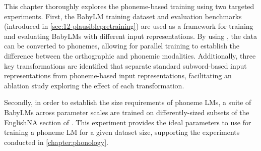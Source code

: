 This chapter thoroughly explores the phoneme-based training using two targeted experiments. First, the BabyLM training dataset and evaluation benchmarks (introduced in \cref{sec:12-plausiblepretraining}) are used as a framework for training and evaluating BabyLMs with different input representations. By using \gpp, the data can be converted to phonemes, allowing for parallel training to establish the difference between the orthographic and phonemic modalities. Additionally, three key transformations are identified that separate standard subword-based input representations from phoneme-based input representations, facilitating an ablation study exploring the effect of each transformation.


Secondly, in order to establish the size requirements of phoneme LMs, a suite of BabyLMs across parameter scales are trained on differently-sized subsets of the EnglishNA section of \ipachildes. This experiment provides the ideal parameters to use for training a phoneme LM for a given dataset size, supporting the experiments conducted in \cref{chapter:phonology}.



